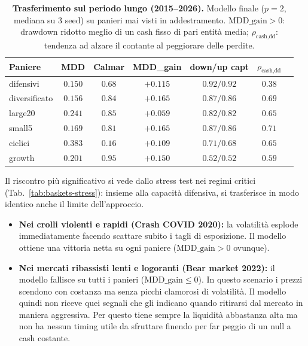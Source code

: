 \begin{table}[H]
\centering
\caption{\textbf{Trasferimento sul periodo lungo (2015--2026).}
Modello finale ($p=2$, mediana su 3 seed) su panieri mai visti in addestramento.
$\mathrm{MDD\_gain}>0$: drawdown ridotto meglio di un cash fisso di pari entità media;
$\rho_{\text{cash,dd}}$: tendenza ad alzare il contante al peggiorare delle perdite.}
\label{tab:baskets-longrun}
\begin{tabular}{lcccccc}
\toprule
Paniere & MDD & Calmar & MDD\_gain & down/up capt & $\rho_{\text{cash,dd}}$ \\
\midrule
difensivi     & $0.150$ & $0.68$ & $+0.115$ & $0.92/0.92$ & $0.38$  \\
diversificato & $0.156$ & $0.84$ & $+0.165$ & $0.87/0.86$ & $0.69$  \\
large20       & $0.241$ & $0.85$ & $+0.059$ & $0.82/0.82$ & $0.65$  \\
small5        & $0.169$ & $0.81$ & $+0.165$ & $0.87/0.86$ & $0.71$ \\
ciclici       & $0.383$ & $0.16$ & $+0.109$ & $0.71/0.68$ & $0.65$ \\
growth        & $0.201$ & $0.95$ & $+0.150$ & $0.52/0.52$ & $0.59$ \\
\bottomrule
\end{tabular}
\end{table}

Il riscontro più significativo si vede dallo stress test nei regimi critici (Tab.~\ref{tab:baskets-stress}): insieme alla capacità difensiva, si trasferisce in modo identico anche il limite dell'approccio. 
\begin{itemize}
    \item \textbf{Nei crolli violenti e rapidi (Crash COVID 2020):} la volatilità esplode immediatamente facendo scattare subito i tagli di esposizione. Il modello ottiene una vittoria netta su ogni paniere ($\mathrm{MDD\_gain} > 0$ ovunque).
    \item \textbf{Nei mercati ribassisti lenti e logoranti (Bear market 2022):} il modello fallisce su tutti i panieri ($\mathrm{MDD\_gain} \le 0$). In questo scenario i prezzi scendono con costanza ma senza picchi clamorosi di volatilità. 
    Il modello quindi non riceve quei segnali che gli indicano quando ritirarsi dal mercato in maniera aggressiva. 
    Per questo tiene sempre la liquidità abbastanza alta ma non ha nessun timing utile da sfruttare finendo per far peggio di un null a cash costante.

\end{itemize}

